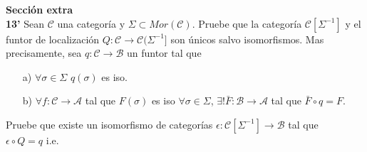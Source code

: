 \textbf{Sección extra}\\

\textbf{13'} Sean $\mathscr{C}$ una categoría y $\Sigma\subset Mor(\mathscr{C})$. Pruebe que la categoría $\mathscr{C}[\Sigma^{-1}]$ y el 
funtor de localización $Q:\mathscr{C}\rightarrow \mathscr{C}(\Sigma^{-1}]$ son únicos salvo isomorfismos. Mas precisamente, sea $q:\mathscr{C}
\rightarrow \mathscr{B}$ un funtor tal que 
\begin{itemize}
\item[a)] $\forall \sigma\in \Sigma$ \quad $q(\sigma)$ es iso.
\item[b)] $\forall f:\mathscr{C}\to \mathscr{A}$ tal que $F(\sigma)$ es iso $\forall \sigma\in \Sigma$, $\exists ! \bar{F}:\mathscr{B}\to\mathscr{A}$
tal que $\bar{F}\circ q=F$.\\
\end{itemize}
Pruebe que existe un isomorfismo de categorías $\epsilon:\mathscr{C}[\Sigma^{-1}]\to \mathscr{B}$ tal que \\$\epsilon\circ Q=q$ \quad i.e. \\
\centerline{
}
